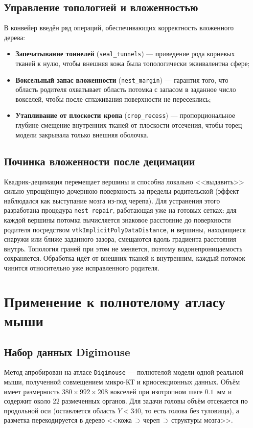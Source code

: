 \documentclass[a4paper,14pt]{article}
\begin{document}
\subsection{Управление топологией и вложенностью}
В конвейер введён ряд операций, обеспечивающих корректность вложенного дерева:
\begin{itemize}
    \item \textbf{Запечатывание тоннелей} (\texttt{seal\_tunnels}) --- приведение рода корневых тканей к нулю, чтобы внешняя кожа была топологически эквивалентна сфере;
    \item \textbf{Воксельный запас вложенности} (\texttt{nest\_margin}) --- гарантия того, что область родителя охватывает область потомка с запасом в заданное число вокселей, чтобы после сглаживания поверхности не пересеклись;
    \item \textbf{Утапливание от плоскости кропа} (\texttt{crop\_recess}) --- пропорциональное глубине смещение внутренних тканей от плоскости отсечения, чтобы торец модели закрывала только внешняя оболочка.
\end{itemize}

\subsection{Починка вложенности после децимации}
Квадрик-децимация \cite{garland1997} перемещает вершины и способна локально <<выдавить>> сильно упрощённую дочернюю поверхность за пределы родительской (эффект наблюдался как выступание мозга из-под черепа). Для устранения этого разработана процедура \texttt{nest\_repair}, работающая уже на готовых сетках: для каждой вершины потомка вычисляется знаковое расстояние до поверхности родителя посредством \texttt{vtkImplicitPolyDataDistance}, и вершины, находящиеся снаружи или ближе заданного зазора, смещаются вдоль градиента расстояния внутрь. Топология граней при этом не меняется, поэтому водонепроницаемость сохраняется. Обработка идёт от внешних тканей к внутренним, каждый потомок чинится относительно уже исправленного родителя.

\newpage
\section{Применение к полнотелому атласу мыши}

\subsection{Набор данных Digimouse}
Метод апробирован на атласе \texttt{Digimouse} \cite{dogdas2007} --- полнотелой модели одной реальной мыши, полученной совмещением микро-КТ и криосекционных данных. Объём имеет размерность $380 \times 992 \times 208$ вокселей при изотропном шаге $0.1$~мм и содержит около $22$ размеченных органов. Для задачи головы объём отсекается по продольной оси (оставляется область $Y < 340$, то есть голова без туловища), а разметка перекодируется в дерево <<кожа\,$\supset$\,череп\,$\supset$\,структуры мозга>>.
\end{document}
